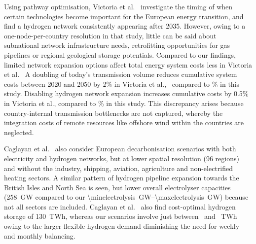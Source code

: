 Using pathway optimisation, Victoria et
al.~\cite{victoriaSpeedTechnological2022} investigate the timing of when certain
technologies become important for the European energy transition, and find a
hydrogen network consistently appearing after 2035. However, owing to a
one-node-per-country resolution in that study, little can be said about
subnational network infrastructure needs, retrofitting opportunities for gas
pipelines or regional geological storage potentials. Compared to our findings,
limited network expansion options affect total energy system costs less in
Victoria et al.~\cite{victoriaSpeedTechnological2022} A doubling of today's
transmission volume reduces cumulative system costs between 2020 and 2050 by 2\%
in Victoria et al.,~\cite{victoriaSpeedTechnological2022} compared to
\maxacbenefitrel\% in this study. Disabling hydrogen network expansion increases
cumulative costs by 0.5\% in Victoria et
al.,\cite{victoriaSpeedTechnological2022} compared to \maxhybenefitrel\% in this
study. This discrepancy arises because country-internal transmission bottlenecks
are not captured, whereby the integration costs of remote resources like
offshore wind within the countries are neglected.

Caglayan et al.~\cite{Caglayan2019} also consider European decarbonisation
scenarios with both electricity and hydrogen networks, but at lower spatial
resolution (96 regions) and without the industry, shipping, aviation,
agriculture and non-electrified heating sectors. A similar pattern of hydrogen
pipeline expansion towards the British Isles and North Sea is seen, but lower
overall electrolyser capacities (258~GW compared to our
\SIrange{\minelectrolysis}{\maxelectrolysis}{\giga\watt}) because not all
sectors are included. Caglayan et al.~\cite{Caglayan2019} also find cost-optimal
hydrogen storage of 130~TWh, whereas our scenarios involve just between
\hydrogenstorageacnhyn~and \hydrogenstorageacnhyy~TWh owing to the larger
flexible hydrogen demand diminishing the need for weekly and monthly balancing.

